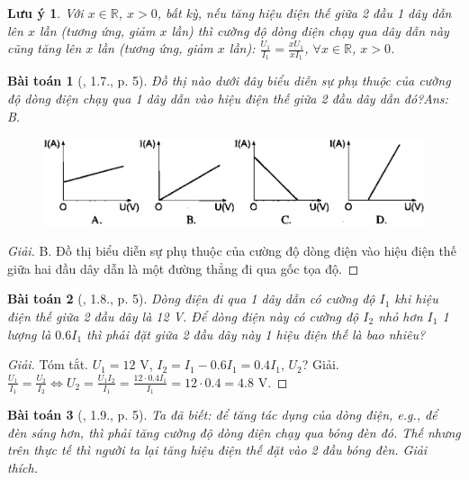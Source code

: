 \documentclass{article}
\newtheorem{baitoan}{Bài toán}
\newtheorem{luuy}{Lưu ý}
\begin{document}
\begin{luuy}
	Với $x\in\mathbb{R}$, $x > 0$, bất kỳ, nếu tăng hiệu điện thế giữa 2 đầu 1 dây dẫn lên $x$ lần (tương ứng, giảm $x$ lần) thì cường độ dòng điện chạy qua dây dẫn này cũng tăng lên $x$ lần (tương ứng, giảm $x$ lần): $\frac{U_1}{I_1} = \frac{xU_1}{xI_1}$, $\forall x\in\mathbb{R}$, $x > 0$.
\end{luuy}

\begin{baitoan}[\cite{SBT_Vat_Ly_9}, 1.7., p. 5]
	Đồ thị nào dưới đây biểu diễn sự phụ thuộc của cường độ dòng điện chạy qua 1 dây dẫn vào hiệu điện thế giữa 2 đầu dây dẫn đó?\hfill{\sf Ans: B.}
	\begin{figure}[H]
		\centering
		\includegraphics[scale=0.25]{SBT_1.1}
	\end{figure}
\end{baitoan}

\begin{proof}[Giải]
	{\sf B.} Đồ thị biểu diễn sự phụ thuộc của cường độ dòng điện vào hiệu điện thế giữa hai đầu dây dẫn là một đường thẳng đi qua gốc tọa độ.
\end{proof}

\begin{baitoan}[\cite{SBT_Vat_Ly_9}, 1.8., p. 5]
	Dòng điện đi qua 1 dây dẫn có cường độ $I_1$ khi hiệu điện thế giữa 2 đầu dây là \emph{12 V}. Để dòng điện này có cường độ $I_2$ nhỏ hơn $I_1$ 1 lượng là $0.6I_1$ thì phải đặt giữa 2 đầu dây này 1 hiệu điện thế là bao nhiêu?
\end{baitoan}

\begin{proof}[Giải]
	\textsf{Tóm tắt.} $U_1 = 12$ V, $I_2 = I_1 - 0.6I_1 = 0.4I_1$, $U_2$? \textsf{Giải.} $\frac{U_1}{I_1} = \frac{U_2}{I_2}\Leftrightarrow U_2 = \frac{U_1I_2}{I_1} = \frac{12\cdot0.4I_1}{I_1} = 12\cdot0.4 = 4.8$ V.
\end{proof}

\begin{baitoan}[\cite{SBT_Vat_Ly_9}, 1.9., p. 5]
	Ta đã biết: để tăng tác dụng của dòng điện, e.g., để đèn sáng hơn, thì phải tăng cường độ dòng điện chạy qua bóng đèn đó. Thế nhưng trên thực tế thì người ta lại tăng hiệu điện thế đặt vào 2 đầu bóng đèn. Giải thích.
\end{baitoan}
\end{document}
